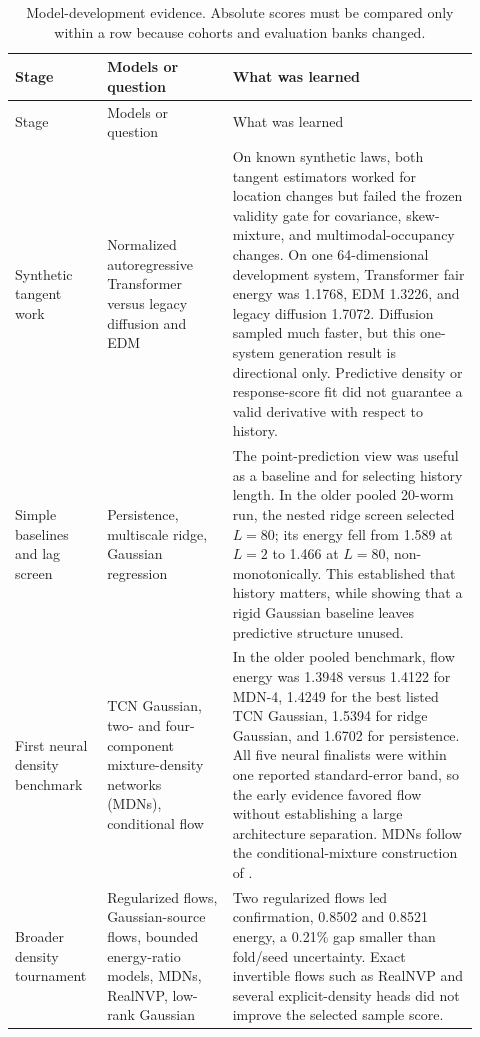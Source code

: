 \documentclass[11pt]{article}
\begin{document}
\begin{longtable}{p{0.18\linewidth}p{0.25\linewidth}p{0.49\linewidth}}
\caption{Model-development evidence. Absolute scores must be compared only within a row because cohorts and evaluation banks changed.}\label{tab:history}\\
\toprule
Stage & Models or question & What was learned \\
\midrule
\endfirsthead
\toprule
Stage & Models or question & What was learned \\
\midrule
\endhead
Synthetic tangent work & Normalized autoregressive Transformer versus legacy diffusion and EDM & On known synthetic laws, both tangent estimators worked for location changes but failed the frozen validity gate for covariance, skew-mixture, and multimodal-occupancy changes. On one 64-dimensional development system, Transformer fair energy was 1.1768, EDM 1.3226, and legacy diffusion 1.7072. Diffusion sampled much faster, but this one-system generation result is directional only. Predictive density or response-score fit did not guarantee a valid derivative with respect to history. \\
\addlinespace
Simple baselines and lag screen & Persistence, multiscale ridge, Gaussian regression & The point-prediction view was useful as a baseline and for selecting history length. In the older pooled 20-worm run, the nested ridge screen selected $L=80$; its energy fell from 1.589 at $L=2$ to 1.466 at $L=80$, non-monotonically. This established that history matters, while showing that a rigid Gaussian baseline leaves predictive structure unused. \\
\addlinespace
First neural density benchmark & TCN Gaussian, two- and four-component mixture-density networks (MDNs), conditional flow & In the older pooled benchmark, flow energy was 1.3948 versus 1.4122 for MDN-4, 1.4249 for the best listed TCN Gaussian, 1.5394 for ridge Gaussian, and 1.6702 for persistence. All five neural finalists were within one reported standard-error band, so the early evidence favored flow without establishing a large architecture separation. MDNs follow the conditional-mixture construction of \citet{bishop1994mdn}. \\
\addlinespace
Broader density tournament & Regularized flows, Gaussian-source flows, bounded energy-ratio models, MDNs, RealNVP, low-rank Gaussian & Two regularized flows led confirmation, 0.8502 and 0.8521 energy, a 0.21\% gap smaller than fold/seed uncertainty. Exact invertible flows such as RealNVP \citep{dinh2017realnvp} and several explicit-density heads did not improve the selected sample score. \\

\end{longtable}
\end{document}
